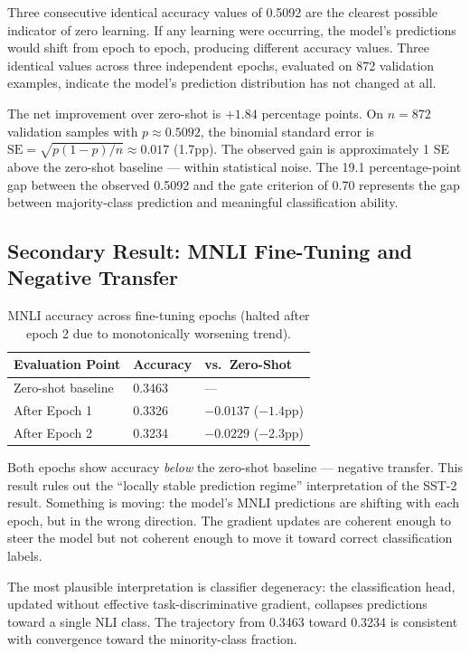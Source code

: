 Three consecutive identical accuracy values of 0.5092 are the clearest possible indicator of zero learning. If any learning were occurring, the model's predictions would shift from epoch to epoch, producing different accuracy values. Three identical values across three independent epochs, evaluated on 872 validation examples, indicate the model's prediction distribution has not changed at all.

The net improvement over zero-shot is $+1.84$ percentage points. On $n=872$ validation samples with $p \approx 0.5092$, the binomial standard error is $\text{SE} = \sqrt{p(1-p)/n} \approx 0.017$ (1.7pp). The observed gain is approximately 1 SE above the zero-shot baseline --- within statistical noise. The 19.1 percentage-point gap between the observed 0.5092 and the gate criterion of 0.70 represents the gap between majority-class prediction and meaningful classification ability.

\subsection{Secondary Result: MNLI Fine-Tuning and Negative Transfer}

\begin{table}[h]
\centering
\caption{MNLI accuracy across fine-tuning epochs (halted after epoch 2 due to monotonically worsening trend).}
\label{tab:mnli}
\begin{tabular}{@{}lll@{}}
\toprule
\textbf{Evaluation Point} & \textbf{Accuracy} & \textbf{vs.\ Zero-Shot} \\
\midrule
Zero-shot baseline & 0.3463 & --- \\
After Epoch 1 & 0.3326 & $-0.0137$ ($-1.4$pp) \\
After Epoch 2 & 0.3234 & $-0.0229$ ($-2.3$pp) \\
\bottomrule
\end{tabular}
\end{table}

Both epochs show accuracy \emph{below} the zero-shot baseline --- negative transfer. This result rules out the ``locally stable prediction regime'' interpretation of the SST-2 result. Something is moving: the model's MNLI predictions are shifting with each epoch, but in the wrong direction. The gradient updates are coherent enough to steer the model but not coherent enough to move it toward correct classification labels.

The most plausible interpretation is classifier degeneracy: the classification head, updated without effective task-discriminative gradient, collapses predictions toward a single NLI class. The trajectory from 0.3463 toward 0.3234 is consistent with convergence toward the minority-class fraction.

